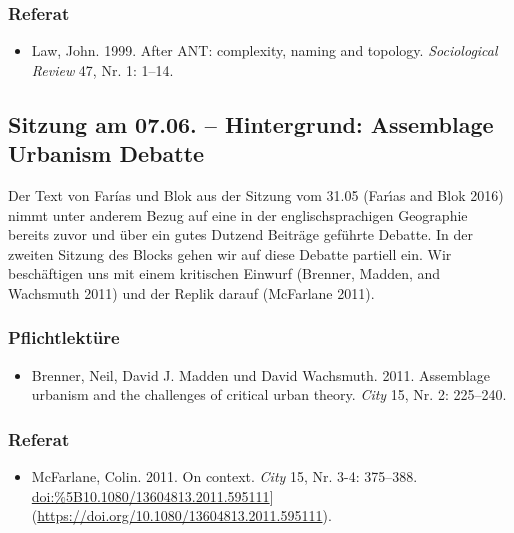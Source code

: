 \documentclass[
]{article}
\providecommand{\tightlist}{%
  \setlength{\itemsep}{0pt}\setlength{\parskip}{0pt}}
\begin{document}
\hypertarget{referat-5}{%
\subsubsection*{Referat}\label{referat-5}}

\begin{itemize}
\tightlist
\item
  Law, John. 1999. After ANT: complexity, naming and topology. \emph{Sociological Review} 47, Nr. 1: 1--14.
\end{itemize}

\hypertarget{sitzung-am-07.06.-hintergrund-assemblage-urbanism-debatte}{%
\subsection{Sitzung am 07.06. -- Hintergrund: Assemblage Urbanism Debatte}\label{sitzung-am-07.06.-hintergrund-assemblage-urbanism-debatte}}

Der Text von Farías und Blok aus der Sitzung vom 31.05 (Farı́as and Blok 2016) nimmt unter anderem Bezug auf eine in der englischsprachigen Geographie bereits zuvor und über ein gutes Dutzend Beiträge geführte Debatte. In der zweiten Sitzung des Blocks gehen wir auf diese Debatte partiell ein. Wir beschäftigen uns mit einem kritischen Einwurf (Brenner, Madden, and Wachsmuth 2011) und der Replik darauf (McFarlane 2011).

\hypertarget{pflichtlektuxfcre-6}{%
\subsubsection*{Pflichtlektüre}\label{pflichtlektuxfcre-6}}

\begin{itemize}
\tightlist
\item
  Brenner, Neil, David J. Madden und David Wachsmuth. 2011. Assemblage urbanism and the challenges of critical urban theory. \emph{City} 15, Nr. 2: 225--240.
\end{itemize}

\hypertarget{referat-6}{%
\subsubsection*{Referat}\label{referat-6}}

\begin{itemize}
\tightlist
\item
  McFarlane, Colin. 2011. On context. \emph{City} 15, Nr. 3-4: 375--388. \url{doi:\%5B10.1080/13604813.2011.595111}{]}(\url{https://doi.org/10.1080/13604813.2011.595111}).
\end{itemize}
\end{document}
